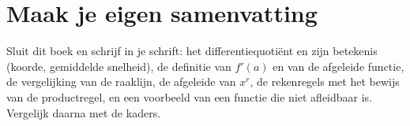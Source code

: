 
\ifzelfstudie
\section*{Maak je eigen samenvatting}
Sluit dit boek en schrijf in je schrift: het differentiequotiënt en zijn betekenis (koorde, gemiddelde snelheid), de definitie van $f'(a)$ en van de afgeleide functie, de vergelijking van de raaklijn, de afgeleide van $x^r$, de rekenregels met het bewijs van de productregel, en een voorbeeld van een functie die niet afleidbaar is. Vergelijk daarna met de kaders.
\fi
